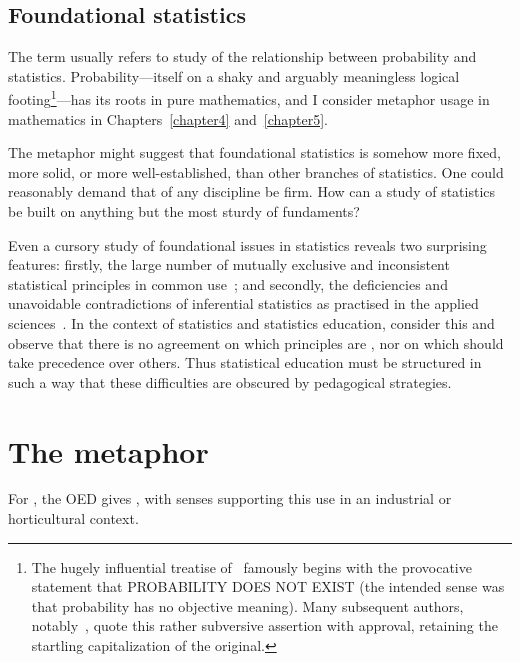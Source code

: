 \subsection{Foundational statistics}
\label{foundational_statistics}
The term  usually refers to study of
the relationship between probability and statistics.
Probability---itself on a shaky and arguably meaningless logical
footing\footnote{The hugely influential treatise
  of~ famously begins with the provocative
  statement that PROBABILITY DOES NOT EXIST (the intended sense was
  that probability has no objective meaning).  Many subsequent
  authors, notably~, quote this rather subversive
  assertion with approval, retaining the startling capitalization of
  the original.}---has its roots in pure mathematics, and I consider
metaphor usage in mathematics in Chapters~\ref{chapter4}
and~\ref{chapter5}.

The  metaphor might suggest that foundational
statistics is somehow more fixed, more solid, or more
well-established, than other branches of statistics.  One could
reasonably demand that  of any discipline be firm.
How can a study of statistics be built on anything but the most sturdy
of fundaments?

Even a cursory study of foundational issues in statistics reveals two
surprising features: firstly, the large number of mutually exclusive
and inconsistent statistical principles in common
use~\parencite{edwards1984}; and secondly, the deficiencies and
unavoidable contradictions of inferential statistics as practised in
the applied sciences~\parencite{wasserstein2016}.  In the context of
statistics and statistics education,  consider this
and observe that there is no agreement on which principles are
, nor on which should take precedence over others.  Thus
statistical education must be structured in such a way that these
difficulties are obscured by pedagogical strategies.

\section{The  metaphor}

For , the OED gives , with senses supporting this use in an
industrial or horticultural context.

